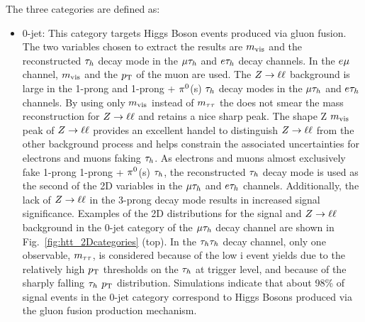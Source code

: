 The three categories are defined as:
\begin{itemize}
\item {0-jet}: This category targets Higgs Boson events produced via gluon fusion.
The two variables chosen to extract the results are $m_\text{vis}$ and
the reconstructed $\tau_{h}$ decay mode in the $\mu\tau_{h}$ and $e\tau_{h}$ decay channels.
In the $e\mu$ channel, $m_\text{vis}$ and the $p_\mathrm{T}$ of the muon are used.  The $Z\to\ell\ell$ background 
is large in the 1-prong and 1-prong + $\pi^{0}$(s) $\tau_{h}$ decay modes in the
$\mu\tau_{h}$ and $e\tau_{h}$ channels.  By using only $m_\text{vis}$ instead of $m_{\tau\tau}$ the \etvecmiss
does not smear the mass reconstruction for $Z\to\ell\ell$ and retains a nice sharp peak.
The shape Z $m_\text{vis}$ peak of $Z\to\ell\ell$ provides 
an excellent handel to distinguish $Z\to\ell\ell$ from the other background process and
helps constrain the associated uncertainties for electrons and muons faking $\tau_{h}$.
As electrons and muons almost exclusively fake 1-prong 1-prong + $\pi^{0}$(s) $\tau_{h}$,
the reconstructed $\tau_{h}$ decay mode is used as the second of the 2D variables in the
$\mu\tau_{h}$ and $e\tau_{h}$ channels.  Additionally, the lack of $Z\to\ell\ell$ in the
3-prong decay mode results in increased signal significance.
Examples of the 2D distributions for the signal and $Z\to\ell\ell$ background
in the 0-jet category of the $\mu\tau_{h}$ decay channel are shown in Fig.~\ref{fig:htt_2Dcategories} (top).
In the $\tau_{h}\tau_{h}$ decay channel, only one observable, $m_{\tau\tau}$, is considered because of the low i
event yields due to the relatively high $p_\mathrm{T}$ thresholds on the $\tau_{h}$ at trigger level, and 
because of the sharply falling $\tau_{h}$ $p_\mathrm{T}$ distribution.  Simulations indicate that about 98\% 
of signal events in the 0-jet category correspond to Higgs Bosons produced via the gluon 
fusion production mechanism.\\


\end{itemize}
